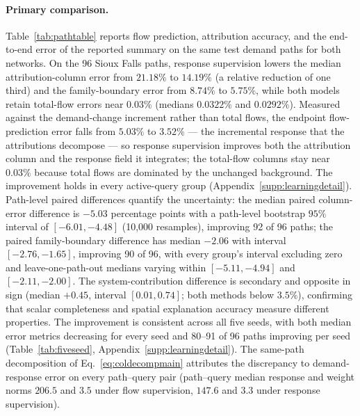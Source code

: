 \paragraph{Primary comparison.}
Table~\ref{tab:pathtable} reports flow prediction, attribution accuracy,
and the end-to-end error of the reported summary on the same test demand
paths for both networks. On the 96 Sioux Falls paths, response
supervision lowers the median attribution-column error from $21.18\%$ to
$14.19\%$ (a relative reduction of one third) and the family-boundary
error from $8.74\%$ to $5.75\%$, while both models retain total-flow
errors near $0.03\%$ (medians $0.0322\%$ and $0.0292\%$). Measured
against the demand-change increment rather than total flows, the
endpoint flow-prediction error falls from $5.03\%$ to $3.52\%$ --- the
incremental response that the attributions decompose --- so response
supervision improves both the attribution column and the response field
it integrates; the total-flow columns stay near $0.03\%$ because total
flows are dominated by the unchanged background. The improvement holds
in every active-query group
(Appendix~\ref{supp:learningdetail}). Path-level paired differences
quantify the uncertainty: the median paired column-error difference is
$-5.03$ percentage points with a path-level bootstrap $95\%$ interval of
$[-6.01,-4.48]$ (10,000 resamples), improving 92 of 96 paths; the
paired family-boundary difference has median $-2.06$ with interval
$[-2.76,-1.65]$, improving 90 of 96, with every group's interval
excluding zero and leave-one-path-out medians varying within
$[-5.11,-4.94]$ and $[-2.11,-2.00]$. The system-contribution difference
is secondary and opposite in sign (median $+0.45$, interval
$[0.01,0.74]$; both methods below $3.5\%$), confirming that scalar
completeness and spatial explanation accuracy measure different
properties. The improvement is consistent across all five seeds, with
both median error metrics decreasing for every seed and 80--91 of 96
paths improving per seed (Table~\ref{tab:fiveseed},
Appendix~\ref{supp:learningdetail}). The same-path decomposition of
Eq.~\eqref{eq:coldecompmain} attributes the discrepancy to demand-response
error on every path--query pair (path--query median response and weight
norms $206.5$ and $3.5$ under flow supervision, $147.6$ and $3.3$ under
response supervision).

